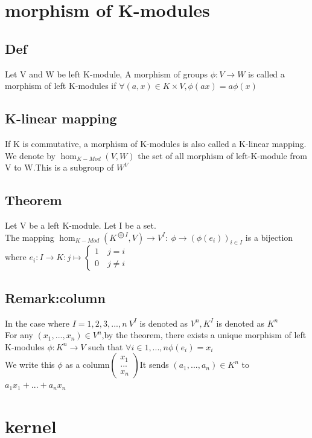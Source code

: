 \documentclass{book}
\begin{document}
\section{morphism of K-modules}
\subsection{Def}

Let V and W be left K-module, A morphism of groups $\phi:V\rightarrow W$ is called a morphism of left K-modules if $\forall(a,x)\in K\times V,\phi(ax)=a\phi(x)$
\subsection{K-linear mapping}
\indent If K is commutative, a morphism of K-modules is also called a K-linear mapping. We denote by $\hom_{K-Mod}(V,W)$ the set of all morphism of left-K-module from V to W.This is a subgroup of $W^V$
\subsection{Theorem}

Let V be a left K-module. Let I be a set.\\
The mapping $\hom_{K-Mod}(K^{\bigoplus I},V)\rightarrow V^I:\ \phi\rightarrow (\phi(e_i))_{i\in I}$ is a bijection where $e_i:I\rightarrow K:j\mapsto\left\{\begin{aligned}
    1\quad j=i\\
    0\quad j\not=i
\end{aligned} \right.$
\subsection{Remark:column}

In the case where $I={1,2,3,...,n}\ V^I$ is denoted as $V^n,K^I$ is denoted as $K^n$\\
For any $(x_1,...,x_n)\in V^n$,by the theorem, there exists a unique morphism of left K-modules $\phi:K^n\rightarrow V$ such that $\forall i\in{1,...,n}\phi(e_i)=x_i$\\
We write this $\phi$ as a column$\begin{pmatrix}
    x_1\\
    ...\\
    x_n
\end{pmatrix}$It sends $(a_1,...,a_n)\in K^n$ to $a_1x_1+...+a_nx_n$
\section{kernel}
\end{document}

